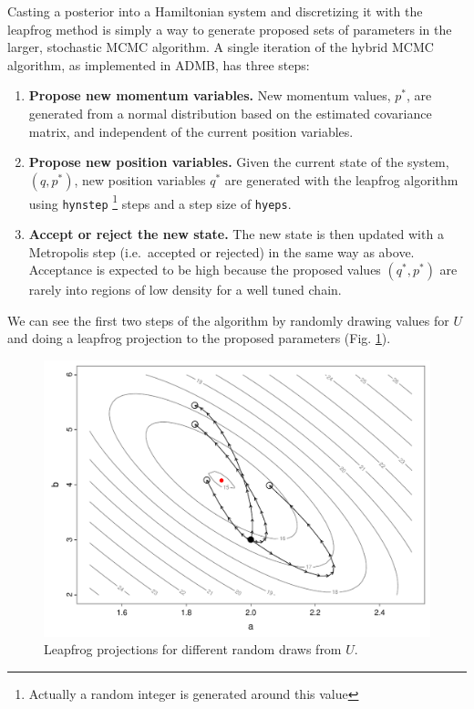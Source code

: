 \documentclass{article}\usepackage[]{graphicx}\usepackage[]{color}
\begin{document}
Casting a posterior into a Hamiltonian system and
discretizing it with the leapfrog method is simply a way to
generate proposed sets of parameters in the larger,
stochastic MCMC algorithm. A single iteration of the hybrid
MCMC algorithm, as implemented in ADMB, has three steps:
\begin{enumerate}
\item \textbf{Propose new momentum variables.} New momentum
  values, $p^*$, are generated from a normal distribution
  based on the estimated covariance matrix, and independent
  of the current position variables.
\item \textbf{Propose new position variables.} Given the
  current state of the system, $(q,p^*)$, new position
  variables $q^*$ are generated with the leapfrog algorithm
  using \texttt{hynstep} \footnote{Actually a random
    integer is generated around this value} steps and a
  step size of \texttt{hyeps}.
\item \textbf{Accept or reject the new state.} The new state
  is then updated with a Metropolis step (i.e.\ accepted or
  rejected) in the same way as above. Acceptance is expected
  to be high because the proposed values $(q^*, p^*)$ are
  rarely into regions of low density for a well tuned chain.
\end{enumerate}

We can see the first two steps of the algorithm by randomly
drawing values for $U$ and doing a leapfrog projection to
the proposed parameters (Fig. \ref{fig:hybrid_seeds}).
\begin{figure}[h]
  \centering
  \includegraphics[width=5in]{../plots/hybrid_seeds.pdf}
  \caption{Leapfrog projections for different random draws
    from $U$.}
  \label{fig:hybrid_seeds}
\end{figure}
\end{document}
